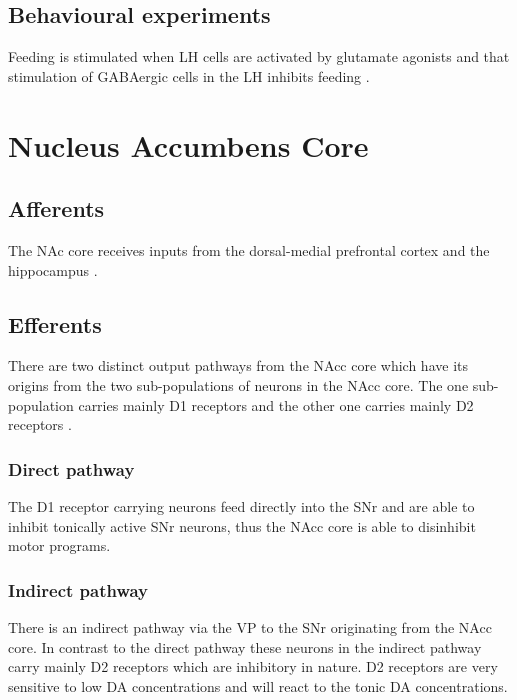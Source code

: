\documentclass[12pt,a4paper]{article}
\let\oldsection\section
\renewcommand\section{\clearpage\oldsection}
\begin{document}
\subsection{Behavioural experiments}

Feeding is stimulated when LH cells are activated by glutamate
agonists \citep{stanley93} and that stimulation of GABAergic cells in the LH inhibits feeding \citep{Stanley2011}.





\section{Nucleus Accumbens Core}

\subsection{Afferents}

The NAc core receives inputs from the dorsal-medial prefrontal cortex and the hippocampus \citep{brog93}.

\subsection{Efferents}

There are two distinct output pathways from the NAcc core which have its origins from the two sub-populations of neurons in the NAcc core. The one sub-population carries mainly D1 receptors and the other one carries mainly D2 receptors \citep{kelley04} \citep{Humphries2010}. 

\subsubsection{Direct pathway}

The D1 receptor carrying neurons feed directly into the SNr and are able to inhibit tonically active SNr neurons, thus the NAcc core is able to disinhibit motor programs. 

\subsubsection{Indirect pathway}

There is an indirect pathway via the VP to the SNr originating from the NAcc core. In contrast to the direct pathway these neurons in the indirect pathway carry mainly D2 receptors which are inhibitory in nature. D2 receptors are very sensitive to low DA concentrations and will react to the tonic DA concentrations. 
\end{document}
